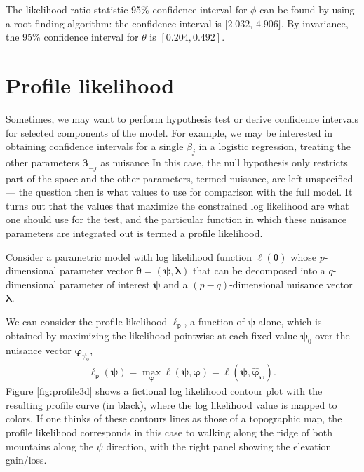 \documentclass[
  11pt,
  letterpaper,
]{book}
\theoremstyle{definition}
\theoremstyle{definition}
\theoremstyle{definition}
\theoremstyle{remark}
\begin{document}
The likelihood ratio statistic 95\% confidence interval for \(\phi\) can be found by using a root finding algorithm: the confidence interval is \([2.032\), \(4.906]\). By invariance, the 95\% confidence interval for \(\theta\) is \([0.204, 0.492]\).

\hypertarget{profile-likelihood}{%
\section{Profile likelihood}\label{profile-likelihood}}

Sometimes, we may want to perform hypothesis test or derive confidence intervals for selected components of the model. For example, we may be interested in obtaining confidence intervals for a single \(\beta_j\) in a logistic regression, treating the other parameters \(\boldsymbol{\beta}_{-j}\) as nuisance In this case, the null hypothesis only restricts part of the space and the other parameters, termed nuisance, are left unspecified --- the question then is what values to use for comparison with the full model. It turns out that the values that maximize the constrained log likelihood are what one should use for the test, and the particular function in which these nuisance parameters are integrated out is termed a profile likelihood.

Consider a parametric model with log likelihood function \(\ell(\boldsymbol{\theta})\) whose \(p\)-dimensional parameter vector \(\boldsymbol{\theta}=(\boldsymbol{\psi}, \boldsymbol{\lambda})\) that can be decomposed into a \(q\)-dimensional parameter of interest \(\boldsymbol{\psi}\) and a \((p-q)\)-dimensional nuisance vector \(\boldsymbol{\lambda}\).

We can consider the profile likelihood \(\ell_{\mathsf{p}}\), a function of \(\boldsymbol{\psi}\) alone, which is obtained by maximizing the likelihood pointwise at each fixed value \(\boldsymbol{\psi}_0\) over the nuisance vector \(\boldsymbol{\varphi}_{\psi_0}\),
\begin{align*}
\ell_{\mathsf{p}}(\boldsymbol{\psi})=\max_{\boldsymbol{\varphi}}\ell(\boldsymbol{\psi}, \boldsymbol{\varphi})=\ell(\boldsymbol{\psi}, \widehat{\boldsymbol{\varphi}}_{\boldsymbol{\psi}}).
\end{align*}
Figure \ref{fig:profile3d} shows a fictional log likelihood contour plot with the resulting profile curve (in black), where the log likelihood value is mapped to colors. If one thinks of these contours lines as those of a topographic map, the profile likelihood corresponds in this case to walking along the ridge of both mountains along the \(\psi\) direction, with the right panel showing the elevation gain/loss.
\end{document}
